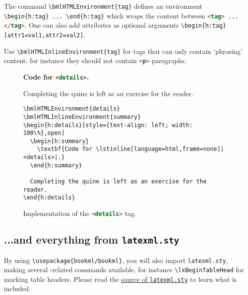 \documentclass[a4paper,british]{article}
\def\ltxinline{\lstinline[style=bookml]}
\def\htmlinline{\lstinline[language=html]}
\begin{document}
The command \ltxinline|\bmlHTMLEnvironment{tag}| defines an environment \ltxinline|\begin{h:tag} ... \end{h:tag}| which wraps the content between \lstinline[language=html,frame=none]|<tag> ... </tag>|. One can also add attributes as optional arguments \ltxinline|\begin{h:tag}[attr1=val1,attr2=val2]|.

Use \ltxinline|\bmlHTMLInlineEnvironment{tag}| for tags that can only contain `phrasing' content, for instance they should not contain \htmlinline|<p>| paragraphs.

\begin{figure}
  \begin{h:details}[style={text-align: left; width: 100\%},open]
    \begin{h:summary}
      \textbf{Code for \lstinline[language=html,frame=none]|<details>|.}
    \end{h:summary}

    Completing the quine is left as an exercise for the reader.
    \begin{lstlisting}[style=bookml]
\bmlHTMLEnvironment{details}
\bmlHTMLInlineEnvironment{summary}
\begin{h:details}[style={text-align: left; width: 100\%},open]
  \begin{h:summary}
    \textbf{Code for \lstinline[language=html,frame=none]|<details>|.}
  \end{h:summary}

  Completing the quine is left as an exercise for the reader.
\end{h:details}
    \end{lstlisting}
  \end{h:details}
  \caption{Implementation of the \htmlinline|<details>| tag.}
  \label{fig:details}
\end{figure}

\subsection{...and everything from \texttt{latexml.sty}}
By using \ltxinline|\usepackage{bookml/bookml}|, you will also import \texttt{latexml.sty}, making several \LaTeXML{}-related commands available, for instance \ltxinline|\lxBeginTableHead| for marking table headers. Please read the \href{https://github.com/brucemiller/LaTeXML/blob/81f2f004bdaa6860d673382837c4d4e3951a602e/lib/LaTeXML/texmf/latexml.sty}{source of \texttt{latexml.sty}} to learn what is included.
\end{document}
